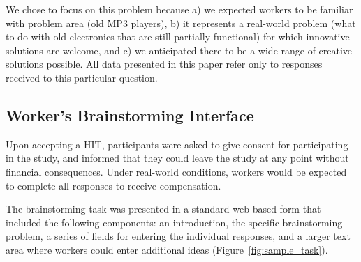 
We chose to focus on this problem because a) we expected workers to be familiar with problem area (old MP3 players), b) it represents a real-world problem (what to do with old electronics that are still partially functional) for which innovative solutions are welcome, and c) we anticipated there to be a wide range of creative solutions possible. All data presented in this paper refer only to responses received to this particular question.


\subsection{Worker's Brainstorming Interface}

Upon accepting a HIT, participants were asked to give consent for participating in the study, and informed that they could leave the study at any point without financial consequences. Under real-world conditions, workers would be expected to complete all responses to receive compensation.

The brainstorming task was presented in a standard web-based form that included the following components: an introduction, the specific brainstorming problem, a series of fields for entering the individual responses, and a larger text area where workers could enter additional ideas (Figure~\ref{fig:sample_task}).

